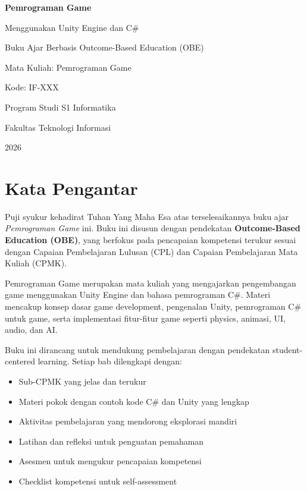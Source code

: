 \frontmatter

\begin{titlepage}
  \centering
  \vspace*{1cm}
  {\LARGE\bfseries Pemrograman Game\par}
  \vspace{0.5cm}
  {\large Menggunakan Unity Engine dan C\#\par}
  \vspace{0.5cm}
  {\large Buku Ajar Berbasis Outcome-Based Education (OBE)\par}
  \vspace{1cm}
  {\large Mata Kuliah: Pemrograman Game\par}
  {\large Kode: IF-XXX\par}
  \vspace{2cm}
  {\large Program Studi S1 Informatika\par}
  {\large Fakultas Teknologi Informasi\par}
  \vfill
  {\large 2026\par}
\end{titlepage}

\cleardoublepage

\chapter*{Kata Pengantar}

Puji syukur kehadirat Tuhan Yang Maha Esa atas terselesaikannya buku ajar \textit{Pemrograman Game} ini. Buku ini disusun dengan pendekatan \textbf{Outcome-Based Education (OBE)}, yang berfokus pada pencapaian kompetensi terukur sesuai dengan Capaian Pembelajaran Lulusan (CPL) dan Capaian Pembelajaran Mata Kuliah (CPMK).

Pemrograman Game merupakan mata kuliah yang mengajarkan pengembangan game menggunakan Unity Engine dan bahasa pemrograman C\#. Materi mencakup konsep dasar game development, pengenalan Unity, pemrograman C\# untuk game, serta implementasi fitur-fitur game seperti physics, animasi, UI, audio, dan AI.

Buku ini dirancang untuk mendukung pembelajaran dengan pendekatan student-centered learning. Setiap bab dilengkapi dengan:
\begin{itemize}
  \item Sub-CPMK yang jelas dan terukur
  \item Materi pokok dengan contoh kode C\# dan Unity yang lengkap
  \item Aktivitas pembelajaran yang mendorong eksplorasi mandiri
  \item Latihan dan refleksi untuk penguatan pemahaman
  \item Asesmen untuk mengukur pencapaian kompetensi
  \item Checklist kompetensi untuk self-assessment
\end{itemize}

